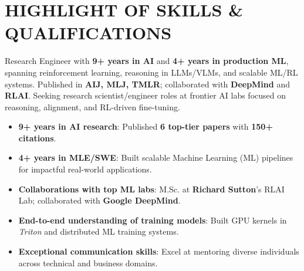 \section{HIGHLIGHT OF SKILLS \& QUALIFICATIONS}
Research Engineer with \textbf{9+ years in AI} and \textbf{4+ years in production ML}, spanning reinforcement learning, reasoning in LLMs/VLMs,
and scalable ML/RL systems. Published in \textbf{AIJ, MLJ, TMLR}; collaborated with \textbf{DeepMind} and \textbf{RLAI}.
Seeking research scientist/engineer roles at frontier AI labs focused on reasoning, alignment, and RL-driven fine-tuning.

\begin{itemize}
    \item \textbf{9+ years in AI research}: Published \textbf{6 top-tier papers} with \textbf{150+ citations}.
    \item \textbf{4+ years in MLE/SWE}: Built scalable Machine Learning (ML) pipelines for impactful real-world applications.
    \item \textbf{Collaborations with top ML labs}: M.Sc. at \textbf{Richard Sutton}'s RLAI Lab; collaborated with \textbf{Google DeepMind}.
    \item \textbf{End-to-end understanding of training models}: Built GPU kernels in \textit{Triton} and distributed ML training systems.
    \item \textbf{Exceptional communication skills}: Excel at mentoring diverse individuals across technical and business domains.
\end{itemize}